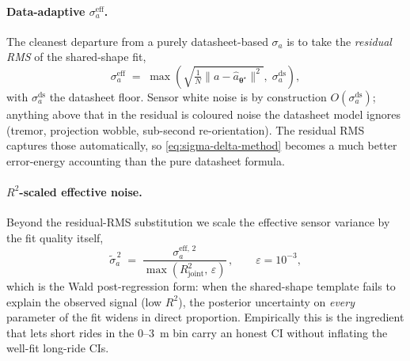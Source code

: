 \paragraph{Data-adaptive $\sigma_a^\mathrm{eff}$.} The cleanest
departure from a purely datasheet-based $\sigma_a$ is to take the
\emph{residual RMS} of the shared-shape fit,
\[
  \sigma_a^\mathrm{eff}
  \;=\;
  \max\!\left(\sqrt{\tfrac{1}{N}\lVert a - \hat a_{\boldsymbol{\theta}^\star}\rVert^2},\;\sigma_a^\mathrm{ds}\right),
\]
with $\sigma_a^\mathrm{ds}$ the datasheet floor. Sensor white noise is
by construction $O(\sigma_a^\mathrm{ds})$; anything above that in the
residual is coloured noise the datasheet model ignores
(tremor, projection wobble, sub-second re-orientation). The
residual RMS captures those automatically, so
\eqref{eq:sigma-delta-method} becomes a much better error-energy
accounting than the pure datasheet formula.

\paragraph{$R^2$-scaled effective noise.} Beyond the residual-RMS
substitution we scale the effective sensor variance by the fit
quality itself,
\begin{equation}
  \tilde{\sigma}_a^{\,2} \;=\;
  \frac{\sigma_a^{\mathrm{eff},\,2}}{\max(R^2_\mathrm{joint},\,\varepsilon)}\,,
  \qquad \varepsilon = 10^{-3},
  \label{eq:r2-scaled-noise}
\end{equation}
which is the Wald post-regression form: when the shared-shape template
fails to explain the observed signal (low $R^2$), the posterior
uncertainty on \emph{every} parameter of the fit widens in direct
proportion. Empirically this is the ingredient that lets short rides
in the $0$--$3$~m bin carry an honest CI without inflating the
well-fit long-ride CIs.

